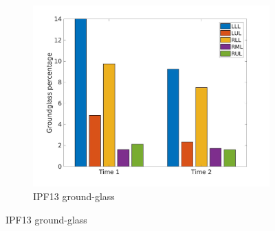 \begin{figure}[H] 
\centering
\begin{subfigure}{.46\linewidth}%
  \includegraphics[width=\linewidth,trim={{.0\wd0} {.0\wd0} {.0\wd0} {.0\wd0}},clip]{Appendix/Image_AppexA/LobarDistribution/IPF13GroundglassLobarRegionDiseaseDistributionOverTime.jpg} %
  \caption{IPF13 ground-glass}
  \label{fig:IPF13LobarRegionDiseaseDistributionOverTime-a} 
\end{subfigure} 
\hspace{.3in}

\end{figure}
